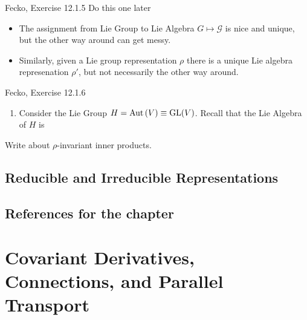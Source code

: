 \documentclass[11pt]{article}
\begin{document}
\begin{ex}{Fecko, Exercise 12.1.5}
    Do this one later
\end{ex}

\vskip 0.5cm
\begin{itemize}
  \item The assignment from Lie Group to Lie Algebra $G \mapsto \mathcal{G}$ is nice and unique, but the other way around can get messy.
  \item Similarly, given a Lie group representation $\rho$ there is a unique Lie algebra represenation $\rho'$, but not necessarily the other way around. 
\end{itemize}


\begin{ex}{Fecko, Exercise 12.1.6}
  \begin{enumerate}[label=(\roman*)]
    \item Consider the Lie Group $H = \mathrm{Aut}\left(V\right) \equiv \mathrm{GL}(V)$. 
    Recall that the Lie Algebra of $H$ is 
  \end{enumerate}
\end{ex}

\vskip 0.5cm
Write about $\rho$-invariant inner products.

\vskip 1cm
\subsection{Reducible and Irreducible Representations}




\vskip 1cm
\subsection*{References for the chapter}


\newpage
\section{Covariant Derivatives, Connections, and Parallel Transport}
\end{document}
